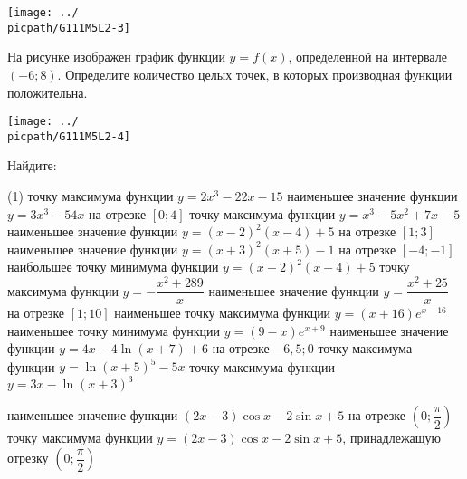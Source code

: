 \begin{class}[number=1]
\begin{listofex}
\begin{minipage}[t]{0.5\linewidth}
			\texttt{[image: ../\\picpath/G111M5L2-3]}
		\end{minipage}
		\item
		\begin{minipage}[t]{0.45\linewidth}
			На рисунке изображен график функции \(y = f(x)\), определенной на интервале \((-6; 8)\). Определите количество целых точек, в которых производная функции положительна.
		\end{minipage}
		\hspace{0.02\linewidth}
		\begin{minipage}[t]{0.5\linewidth}
			\texttt{[image: ../\\picpath/G111M5L2-4]}
		\end{minipage}
		\item Найдите:
		\begin{tasks}(1)
			\task точку максимума функции \(y = 2x^3 -22x-15\)
			\task наименьшее значение функции \(y = 3x^3 - 54x\) на отрезке \([0;4]\)
			\task точку максимума функции \(y = x^3 - 5x^2 + 7x -5\)
			\task наименьшее значение функции \(y=(x-2)^2(x-4)+5\) на отрезке \( [1;3] \)
			\task наименьшее значение функции \(y=(x+3)^2(x+5)-1\) на отрезке \( [-4;-1] \)
			\task наибольшее точку минимума функции \(y=(x-2)^2(x-4)+5\)
			\task точку максимума функции \(y = -\dfrac{x^2+289}{x}\)
			\task наименьшее значение функции \(y = \dfrac{x^2+25}{x}\) на отрезке \([1;10]\)
			\task наименьшее точку максимума функции \(y=(x+16)e^{x-16}\)
			\task наименьшее точку минимума функции \(y=(9-x)e^{x+9}\)
			\task наименьшее значение функции \(y=4x-4\ln(x+7)+6\) на отрезке \( -6,5; 0 \)
			\task точку максимума функции \(y=\ln(x+5)^5-5x\)
			\task точку максимума функции \(y=3x-\ln(x+3)^3\)
			
			\task наименьшее значение функции \( (2x-3)\cos x - 2 \sin x + 5 \) на отрезке \( \left( 0; \dfrac{ \pi }{ 2 } \right) \)
			\task точку максимума функции \( y=(2x-3)\cos x - 2\sin x + 5 \), принадлежащую отрезку \( \left( 0;\dfrac{ \pi }{ 2 } \right) \)
			
		\end{tasks}
	\end{listofex}
\end{class}

